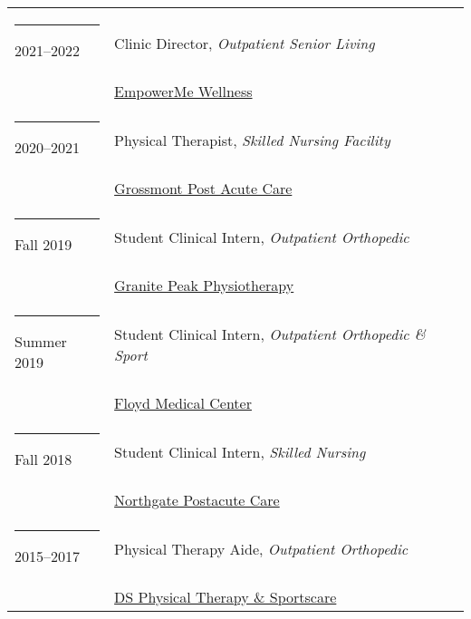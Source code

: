 \documentclass[margin,line]{res}
\begin{document}
\begin{resume}
\begin{longtable}{@{}p{0.7in}p{4in}}
\hspace*{-4mm} \rule{-1mm}{5mm} 2021--2022 & Clinic Director, \textit{Outpatient Senior Living}\\*
\hspace*{-4mm} & \hspace{4mm} \href{https://empowerme.com/}{EmpowerMe Wellness}\\

\hspace*{-4mm} \rule{-1mm}{5mm} 2020--2021 & Physical Therapist, \textit{Skilled Nursing Facility}\\*
\hspace*{-4mm} & \hspace{4mm} \href{https://grossmontpostacute.com/}{Grossmont Post Acute Care}\\

\hspace*{-4mm} \rule{-1mm}{5mm} Fall 2019 & Student Clinical Intern, \textit{Outpatient Orthopedic}\\*
\hspace*{-4mm} & \hspace{4mm} \href{http://www.granitepeakphysiotherapy.com/}{Granite Peak Physiotherapy}\\

\hspace*{-4mm} \rule{-1mm}{5mm} Summer 2019 & Student Clinical Intern, \textit{Outpatient Orthopedic \& Sport}\\*
\hspace*{-4mm} & \hspace{4mm} \href{https://www.floyd.org/Pages/default.aspx}{Floyd Medical Center}\\

\hspace*{-4mm} \rule{-1mm}{5mm} Fall 2018 & Student Clinical Intern, \textit{Skilled Nursing}\\*
\hspace*{-4mm} & \hspace{4mm} \href{http://hamptonhealthltd.com/hampton-in-hospitals/northgate-care-center}{Northgate Postacute Care}\\

\hspace*{-4mm} \rule{-1mm}{5mm} 2015--2017 & Physical Therapy Aide, \textit{Outpatient Orthopedic}\\*
\hspace*{-4mm} & \hspace{4mm} \href{https://www.campbellpt.com/ds-physical-therapy/}{DS Physical Therapy \& Sportscare}\\


\end{longtable}
\end{resume}
\end{document}
